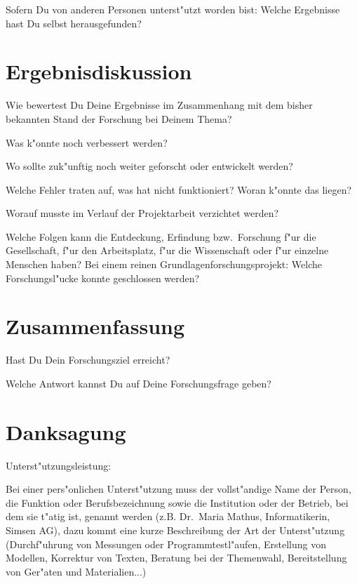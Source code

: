 \documentclass[10pt,twoside]{article}  %
\begin{document}
    Sofern Du von anderen Personen unterst"utzt worden bist: Welche Ergebnisse
    hast Du selbst herausgefunden?

  \section{Ergebnisdiskussion} %
    Wie bewertest Du Deine Ergebnisse im Zusammenhang mit dem bisher bekannten
    Stand der Forschung bei Deinem Thema?

    Was k"onnte noch verbessert werden?

    Wo sollte zuk"unftig noch weiter geforscht oder entwickelt werden?

    Welche Fehler traten auf, was hat nicht funktioniert? Woran k"onnte das
    liegen?

    Worauf musste im Verlauf der Projektarbeit verzichtet werden?

    Welche Folgen kann die Entdeckung, Erfindung bzw.\ Forschung f"ur die
    Gesellschaft, f"ur den Arbeitsplatz, f"ur die Wissenschaft oder f"ur
    einzelne Menschen haben? Bei einem reinen Grundlagenforschungsprojekt:
    Welche Forschungsl"ucke konnte geschlossen werden?

  \section{Zusammenfassung} %
    Hast Du Dein Forschungsziel erreicht?

    Welche Antwort kannst Du auf Deine Forschungsfrage geben?




  \section{Danksagung}
    Unterst"utzungsleistung:

    Bei einer pers"onlichen Unterst"utzung muss der vollst"andige Name der
    Person, die Funktion oder Berufsbezeichnung sowie die Institution oder der
    Betrieb, bei dem sie t"atig ist, genannt werden (z.B. Dr.\ Maria Mathus,
    Informatikerin, Simsen AG), dazu kommt eine kurze Beschreibung der Art der
    Unterst"utzung (Durchf"uhrung von Messungen oder Programmtestl"aufen,
    Erstellung von Modellen, Korrektur von Texten, Beratung bei der Themenwahl,
    Bereitstellung von Ger"aten und Materialien...)
\end{document}
